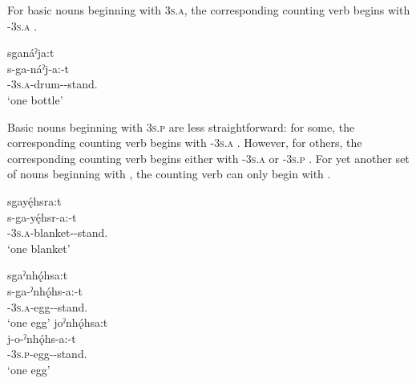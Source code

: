 \ea\label{ex:countingex} 
\z

For basic nouns beginning with  \textsc{3s.a}, the corresponding counting verb begins with  \textsc{\repetitive-3s.a} .

\ea\label{ex:countingex2} sganáˀja:t\\
\gll s-ga-náˀj-a:-t\\
 {\repetitive}-\textsc{3s.a}-drum-{\joinerA}-stand.{\stative}\\
\glt `one bottle'
\z


Basic nouns beginning with  \textsc{3s.p} are less straightforward: for some, the corresponding counting verb begins with  \textsc{\repetitive-3s.a} . However, for others, the corresponding counting verb begins either with  \textsc{\repetitive-3s.a} or  \textsc{\repetitive-3s.p} . For yet another set of nouns beginning with , the counting verb can only begin with  .

\ea\label{ex:countingex3} sgayę́hsra:t\\
\gll s-ga-yę́hsr-a:-t\\
 {\repetitive}-\textsc{3s.a}-blanket-{\joinerA}-stand.{\stative}\\
\glt `one blanket'
\z


\ea\label{ex:countingex4}
\ea sgaˀnhǫ́hsa:t\\
\gll s-ga-ˀnhǫ́hs-a:-t\\
 {\repetitive}-\textsc{3s.a}-egg-{\joinerA}-stand.{\stative}\\
\glt `one egg'
\ex joˀnhǫ́hsa:t\\
\gll j-o-ˀnhǫ́hs-a:-t\\
 {\repetitive}-\textsc{3s.p}-egg-{\joinerA}-stand.{\stative}\\
\glt `one egg'
\z
\z

